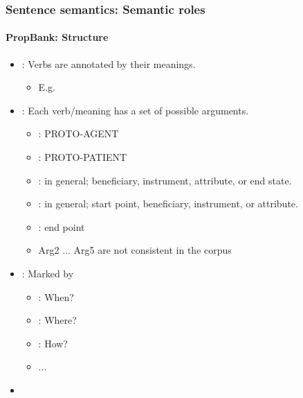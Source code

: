 \documentclass[xcolor=table]{beamer}
\begin{document}
\begin{frame}
	\frametitle{Sentence semantics: Semantic roles}
	\framesubtitle{PropBank: Structure}
	
	\begin{itemize}
		\item {}: Verbs are annotated by their meanings.
		\begin{itemize}
			\item E.g. 		
		\end{itemize}
		
		\item {}: Each verb/meaning has a set of possible arguments.  
		\begin{itemize}
			\item {}: PROTO-AGENT
			\item {}: PROTO-PATIENT
			\item {}: in general; beneficiary, instrument, attribute, or end state.
			\item {}: in general; start point, beneficiary, instrument, or attribute.
			\item {}: end point
			\item Arg2 ... Arg5 are not consistent in the corpus
		\end{itemize}
	
		\item {}: Marked by   
		\begin{itemize}
			\item {}: When?
			\item {}: Where?
			\item {}: How? 
			\item ...
		\end{itemize}
		
		\item {} 
	\end{itemize}
	
\end{frame}
\end{document}
